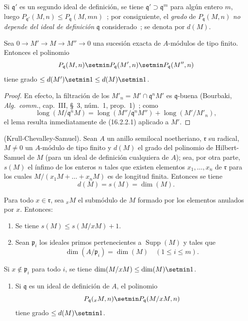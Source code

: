 Si $\mathfrak{q}'$ es un segundo ideal de definición, se tiene
$\mathfrak{q}'\supset\mathfrak{q}^m$ para algún entero $m$, luego
$P_{\mathfrak{q}'}(M,n)\leq P_{\mathfrak{q}}(M,mn)$~; por consiguiente, el
\emph{grado} de $P_{\mathfrak{q}}(M,n)$ \emph{no depende del ideal de definición}
$\mathfrak{q}$ considerado~; se denota por $d(M)$.

\begin{lemma}[16.2.2.2]
\label{0.16.2.2.2-es}
Sea $0\to M'\to M\to M''\to0$ una sucesión exacta de $A$-módulos de tipo
finito. Entonces el polinomio
\[
  P_{\mathfrak{q}}(M,n)\setmin P_{\mathfrak{q}}(M',n)
  \setmin P_{\mathfrak{q}}(M'',n)
\]
tiene grado $\leq d(M')\setmin 1\leq d(M)\setmin 1$.
\end{lemma}

\begin{proof}
En efecto, la filtración de los
$M'_n=M'\cap\mathfrak{q}^nM'$ es $\mathfrak{q}$-buena (Bourbaki,
\emph{Alg.~comm.}, cap.~III, \S~3, núm.~1, prop.~1)~; como
\[
  \operatorname{long}(M/\mathfrak{q}^nM)
  =\operatorname{long}(M''/\mathfrak{q}^nM'')
  +\operatorname{long}(M'/M'_n),
\]
el lema resulta inmediatamente de (16.2.2.1) aplicado a $M'$.
\end{proof}

\begin{theorem}[16.2.3]
\label{0.16.2.3-es}
\textup{(Krull-Chevalley-Samuel).}
Sean $A$ un anillo semilocal noetheriano, $\mathfrak{r}$ su radical,
$M\neq0$ un $A$-módulo de tipo finito y $d(M)$ el grado del polinomio de
Hilbert-Samuel de $M$ (para un ideal de definición cualquiera de $A$); sea,
por otra parte, $s(M)$ el ínfimo de los enteros $n$ tales que existen elementos
$x_1,\ldots,x_n$ de $\mathfrak{r}$ para los cuales
$M/(x_1M+\ldots+x_nM)$ es de longitud finita. Entonces se tiene
\[
  d(M)=s(M)=\dim(M).
\]
\end{theorem}

\begin{lemma}[16.2.3.1]
\label{0.16.2.3.1-es}
Para todo $x\in\mathfrak{r}$, sea ${}_xM$ el submódulo de $M$ formado por los
elementos anulados por $x$. Entonces:
\begin{enumerate}
  \item[\rm{(i)}] Se tiene $s(M)\leq s(M/xM)+1$.
  \item[\rm{(ii)}] Sean $\mathfrak{p}_i$ los ideales primos pertenecientes a
  $\operatorname{Supp}(M)$ y tales que
  \[
    \dim(A/\mathfrak{p}_i)=\dim(M)\quad(1\leq i\leq m).
  \]
\end{enumerate}
Si $x\notin\mathfrak{p}_i$ para todo $i$, se tiene
$\dim(M/xM)\leq\dim(M)\setmin 1$.
\begin{enumerate}
  \item[\rm{(iii)}] Si $\mathfrak{q}$ es un ideal de definición de $A$, el
  polinomio
  \[
    P_{\mathfrak{q}}({}_xM,n)\setmin P_{\mathfrak{q}}(M/xM,n)
  \]
  tiene grado $\leq d(M)\setmin 1$.
\end{enumerate}
\end{lemma}

